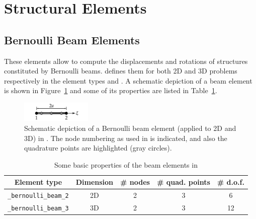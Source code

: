 \section{Structural Elements}

\subsection*{Bernoulli Beam Elements}
These elements allow to compute the displacements and rotations of
structures constituted by Bernoulli beams. \akantu defines them for
both 2D and 3D problems respectively in the element types
 and . A
schematic depiction of a beam element is shown in
Figure~\ref{fig:elements:bernoulli} and some of its properties are
listed in Table~\ref{tab:elements:bernoulli}.


\begin{figure}[htb]
  \centering
  \includegraphics[width=0.3\textwidth]{figures/elements/bernoulli_2}
  \caption{Schematic depiction of a Bernoulli beam element (applied to
    2D and 3D) in \akantu. The node numbering as used in \akantu is
    indicated, and also the quadrature points are highlighted (gray
    circles).}
  \label{fig:elements:bernoulli}
\end{figure}
\begin{table}[htb]
  \centering
  \begin{tabular}{c|cccc}
    \toprule
    Element type                  & Dimension & \# nodes &\# quad. points & \# d.o.f.\\
    \midrule
    \texttt{\_bernoulli\_beam\_2} &         2D&         2&              3&  6\\
    \texttt{\_bernoulli\_beam\_3} &         3D&         2&              3&  12\\
    \bottomrule
  \end{tabular}
  \caption{Some basic properties of the beam elements in \akantu}
  \label{tab:elements:bernoulli}
\end{table}
